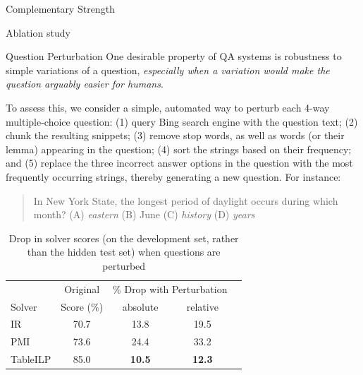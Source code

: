 \documentclass[final]{beamer}
\newlength{\onecolwid}
\newcommand{\tableilp}{TableILP}
\newcommand\lucene{IR}
\newcommand\salience{PMI}
\begin{document}
\begin{frame}[t]
\begin{columns}[t]
\begin{column}{\onecolwid}
\begin{block}{Complementary Strength}
\begin{block}{Ablation study}
\end{block}

\begin{block}{Question Perturbation }
One desirable property of QA systems is robustness to simple variations of a question, \emph{especially when a variation would make the question arguably easier for humans}. 

To assess this, we consider a simple, automated way to perturb each 4-way multiple-choice question: (1) query Bing search engine with the question text; (2) chunk the resulting snippets; (3) remove stop words, as well as words (or their lemma) appearing in the question; (4) sort the  strings based on their frequency; and (5) replace the three incorrect answer options in the question with the most frequently occurring strings, thereby generating a new question. For instance:
\begin{quote}
	{In New York State, the longest period of daylight occurs during which month? (A) \emph{eastern} (B) June (C) \emph{history} (D) \emph{years}}
\end{quote}

\begin{table}[htb]
	\centering
	\small
	\setlength\tabcolsep{10pt}
	\setlength\doublerulesep{\arrayrulewidth}
	\begin{tabular}{l|cccc}
		& Original & \multicolumn{2}{c}{\% Drop with Perturbation} \\
		\cline{3-4}
		Solver & Score (\%) & \bigstrut[t] absolute & relative \\
		\hline\hline \bigstrut[t]
		\lucene & 70.7 & 13.8 & 19.5 \\
		\salience & 73.6 & 24.4 & 33.2 \\
		\tableilp & 85.0 & {\bf 10.5} & {\bf 12.3} \\
		\hline
	\end{tabular}
	\caption{Drop in solver scores (on the development set, rather than the hidden test set) when questions are perturbed}
	\label{tab:perturbation}
\end{table}
\end{block}
\end{block}




\end{column}
\end{columns}
\end{frame}
\end{document}
